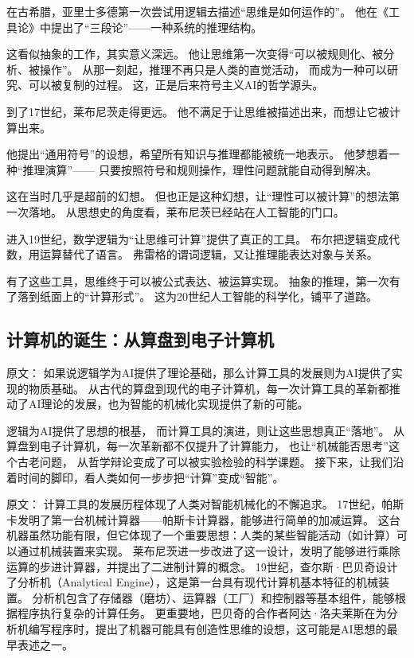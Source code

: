 在古希腊，亚里士多德第一次尝试用逻辑去描述“思维是如何运作的”。
他在《工具论》中提出了“三段论”——一种系统的推理结构。

这看似抽象的工作，其实意义深远。
他让思维第一次变得“可以被规则化、被分析、被操作”。
从那一刻起，推理不再只是人类的直觉活动，
而成为一种可以研究、可以被复制的过程。
这，正是后来符号主义AI的哲学源头。

到了17世纪，莱布尼茨走得更远。
他不满足于让思维被描述出来，而想让它被计算出来。

他提出“通用符号”的设想，希望所有知识与推理都能被统一地表示。
他梦想着一种“推理演算”——
只要按照符号和规则操作，理性问题就能自动得到解决。

这在当时几乎是超前的幻想。
但也正是这种幻想，让“理性可以被计算”的想法第一次落地。
从思想史的角度看，莱布尼茨已经站在人工智能的门口。

进入19世纪，数学逻辑为“让思维可计算”提供了真正的工具。
布尔把逻辑变成代数，用运算替代了语言。
弗雷格的谓词逻辑，又让推理能表达对象与关系。

有了这些工具，思维终于可以被公式表达、被运算实现。
抽象的推理，第一次有了落到纸面上的“计算形式”。
这为20世纪人工智能的科学化，铺平了道路。

\subsection{计算机的诞生：从算盘到电子计算机}

原文：
如果说逻辑学为AI提供了理论基础，那么计算工具的发展则为AI提供了实现的物质基础。
从古代的算盘到现代的电子计算机，每一次计算工具的革新都推动了AI理论的发展，也为智能的机械化实现提供了新的可能。

逻辑为AI提供了思想的根基，
而计算工具的演进，则让这些思想真正“落地”。
从算盘到电子计算机，每一次革新都不仅提升了计算能力，
也让“机械能否思考”这个古老问题，
从哲学辩论变成了可以被实验检验的科学课题。
接下来，让我们沿着时间的脚印，看人类如何一步步把“计算”变成“智能”。

原文：
计算工具的发展历程体现了人类对智能机械化的不懈追求。
17世纪，帕斯卡发明了第一台机械计算器——帕斯卡计算器，能够进行简单的加减运算。
这台机器虽然功能有限，但它体现了一个重要思想：人类的某些智能活动（如计算）可以通过机械装置来实现。
莱布尼茨进一步改进了这一设计，发明了能够进行乘除运算的步进计算器，并提出了二进制计算的概念。
19世纪，查尔斯·巴贝奇设计了分析机（Analytical Engine），这是第一台具有现代计算机基本特征的机械装置。
分析机包含了存储器（磨坊）、运算器（工厂）和控制器等基本组件，能够根据程序执行复杂的计算任务。
更重要地，巴贝奇的合作者阿达·洛夫莱斯在为分析机编写程序时，提出了机器可能具有创造性思维的设想，这可能是AI思想的最早表述之一。

